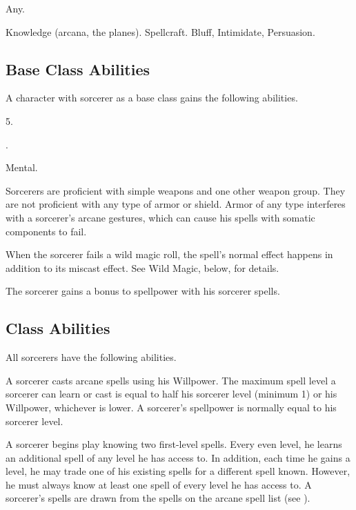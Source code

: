      Any.

     Knowledge (arcana, the planes).
     Spellcraft.
     Bluff, Intimidate, Persuasion.

    \subsection{Base Class Abilities}
        A character with sorcerer as a base class gains the following abilities.

         5.

         .

          Mental.

        Sorcerers are proficient with simple weapons  and one other weapon group.
        They are not proficient with any type of armor or shield.
        Armor of any type interferes with a sorcerer's arcane gestures, which can cause his spells with somatic components to fail.

        When the sorcerer fails a wild magic roll, the spell's normal effect happens in addition to its miscast effect.
        See Wild Magic, below, for details.

        The sorcerer gains a  bonus to spellpower with his sorcerer spells.

    \subsection{Class Abilities}
        All sorcerers have the following abilities.

        A sorcerer casts arcane spells using his Willpower.
        The maximum spell level a sorcerer can learn or cast is equal to half his sorcerer level (minimum 1) or his Willpower, whichever is lower.
        A sorcerer's spellpower is normally equal to his sorcerer level.

        A sorcerer begins play knowing two first-level spells.
        Every even level, he learns an additional spell of any level he has access to.
        In addition, each time he gains a level, he may trade one of his existing spells for a different spell known.
        However, he must always know at least one spell of every level he has access to.
        A sorcerer's spells are drawn from the spells on the arcane spell list (see ).

